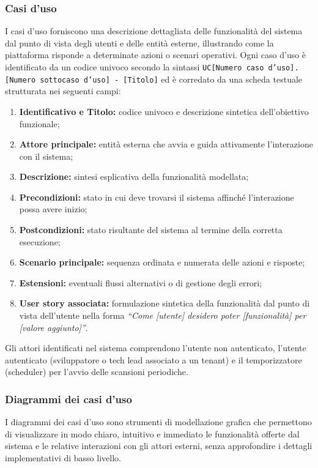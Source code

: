 \subsubsection{Casi d'uso}
I casi d'uso forniscono una descrizione dettagliata delle funzionalità del sistema dal punto di vista degli utenti e delle entità esterne, illustrando come la piattaforma risponde a determinate azioni o scenari operativi. 
Ogni caso d'uso è identificato da un codice univoco secondo la sintassi \texttt{UC[Numero caso d'uso].[Numero sottocaso d'uso] - [Titolo]} ed è corredato da una scheda testuale strutturata nei seguenti campi:
\begin{enumerate}
    \item \textbf{Identificativo e Titolo:} codice univoco e descrizione sintetica dell'obiettivo funzionale;
    \item \textbf{Attore principale:} entità esterna che avvia e guida attivamente l'interazione con il sistema;
    \item \textbf{Descrizione:} sintesi esplicativa della funzionalità modellata;
    \item \textbf{Precondizioni:} stato in cui deve trovarsi il sistema affinché l'interazione possa avere inizio;
    \item \textbf{Postcondizioni:} stato risultante del sistema al termine della corretta esecuzione;
    \item \textbf{Scenario principale:} sequenza ordinata e numerata delle azioni e risposte;
    \item \textbf{Estensioni:} eventuali flussi alternativi o di gestione degli errori;
    \item \textbf{User story associata:} formulazione sintetica della funzionalità dal punto di vista dell'utente nella forma \emph{``Come [utente] desidero poter [funzionalità] per [valore aggiunto]''}.
\end{enumerate}
Gli attori identificati nel sistema comprendono l'utente non autenticato, l'utente autenticato (sviluppatore o tech lead associato a un tenant) e il temporizzatore (scheduler) per l'avvio delle scansioni periodiche.

\subsubsection{Diagrammi dei casi d'uso}
I diagrammi dei casi d'uso sono strumenti di modellazione grafica che permettono di visualizzare in modo chiaro, intuitivo e immediato le funzionalità offerte dal sistema e le relative interazioni con gli attori esterni, senza approfondire i dettagli implementativi di basso livello.

